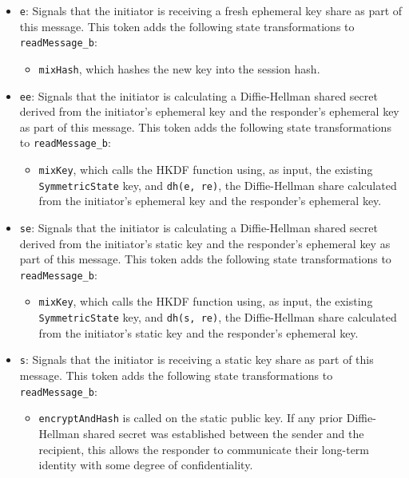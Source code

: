 \begin{itemize}

\item \texttt{e}: Signals that the initiator is receiving a fresh ephemeral key share as part of this message. This token adds the following state transformations to \texttt{readMessage\_b}:
\begin{itemize}

\item \texttt{mixHash}, which hashes the new key into the session hash.
\end{itemize}


\item \texttt{ee}: Signals that the initiator is calculating a Diffie-Hellman shared secret derived from the initiator's ephemeral key and the responder's ephemeral key as part of this message. This token adds the following state transformations to \texttt{readMessage\_b}:
\begin{itemize}

\item \texttt{mixKey}, which calls the HKDF function using, as input, the existing \texttt{SymmetricState} key, and \texttt{dh(e, re)}, the Diffie-Hellman share calculated from the initiator's ephemeral key and the responder's ephemeral key.
\end{itemize}


\item \texttt{se}: Signals that the initiator is calculating a Diffie-Hellman shared secret derived from the initiator's static key and the responder's ephemeral key as part of this message. This token adds the following state transformations to \texttt{readMessage\_b}:
\begin{itemize}

\item \texttt{mixKey}, which calls the HKDF function using, as input, the existing \texttt{SymmetricState} key, and \texttt{dh(s, re)}, the Diffie-Hellman share calculated from the initiator's static key and the responder's ephemeral key.
\end{itemize}


\item \texttt{s}: Signals that the initiator is receiving a static key share as part of this message. This token adds the following state transformations to \texttt{readMessage\_b}:
\begin{itemize}

\item \texttt{encryptAndHash} is called on the static public key. If any prior Diffie-Hellman shared secret was established between the sender and the recipient, this allows the responder to communicate their long-term identity with some degree of confidentiality.
\end{itemize}



\end{itemize}
